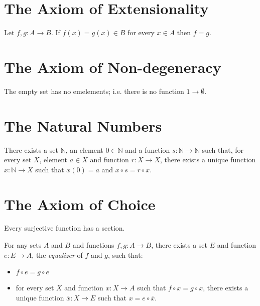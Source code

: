 \section{The Axiom of Extensionality}

\begin{ax}[Extensionality]
  Let $f, g : A \rightarrow B$. If $f(x) = g(x) \in B$ for every $x \in A$ then $f = g$.
\end{ax}

\section{The Axiom of Non-degeneracy}

\begin{ax}
  The empty set has no emelements; i.e. there is no function $1 \rightarrow \emptyset$.
\end{ax}

\section{The Natural Numbers}

\begin{ax}
  There exists a set $\mathbb{N}$, an element $0 \in \mathbb{N}$ and a function $s : \mathbb{N} \rightarrow \mathbb{N}$ such that, for every set $X$, element $a \in X$ and function $r : X \rightarrow X$, there exists a unique function $x : \mathbb{N} \rightarrow X$ such that $x(0) = a$ and $x \circ s = r \circ x$.
\end{ax}

\section{The Axiom of Choice}

\begin{ax}[Choice]
  Every surjective function has a section.
\end{ax}

\begin{ax}[Equalizers]
  For any sets $A$ and $B$ and functions $f, g : A \rightarrow B$, there exists a set $E$ and function $e : E \rightarrow A$, the \emph{equalizer} of $f$ and $g$, such that:
  \begin{itemize}
    \item
    $f \circ e = g \circ e$
    \item
    for every set $X$ and function $x : X \rightarrow A$ such that $f \circ x = g \circ x$, there exists a unique function $\overline{x} : X \rightarrow E$ such that $x = e \circ \overline{x}$.
  \end{itemize}
\end{ax}

